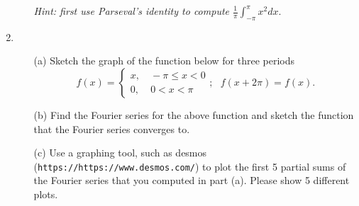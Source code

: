 \documentclass[11pt]{article}
\theoremstyle{definition}
\begin{document}
\begin{enumerate}[leftmargin=*]
\begin{itemize}
\emph{Hint: first use Parseval's identity to compute $\frac{1}{\pi}\int_{-\pi}^{\pi}x^2dx.$}\\
\end{itemize}

\item 
\begin{itemize}
\item[(a)] Sketch the graph of the function below for three periods
\[
f(x)=\left\{ \begin{array}{ll}
x, & \ -\pi\leq x < 0\\
0, & \ 0< x<\pi
\end{array}\right.;
\ \ \ f(x+2\pi)=f(x).
\]
\item[(b)] Find the Fourier series for the above function and sketch the function that the Fourier series converges to.  

\item[(c)] Use a graphing tool, such as desmos (\verb+https://https://www.desmos.com/+) to plot the first 5 partial sums of the Fourier series that you computed in part (a).  Please show 5 different plots. 

\end{itemize}



\end{enumerate}
\end{document}
